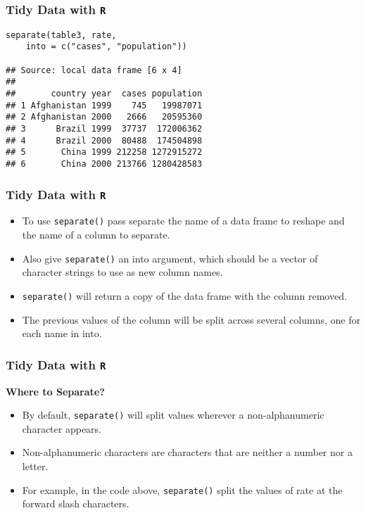 \documentclass[TIDYMASTER.tex]{subfiles}
\begin{document}
\begin{frame}[fragile]
	\frametitle{Tidy Data with \texttt{R}}
	\Large
\begin{verbatim}
separate(table3, rate, 
    into = c("cases", "population"))

## Source: local data frame [6 x 4]
## 
##       country year  cases population
## 1 Afghanistan 1999    745   19987071
## 2 Afghanistan 2000   2666   20595360
## 3      Brazil 1999  37737  172006362
## 4      Brazil 2000  80488  174504898
## 5       China 1999 212258 1272915272
## 6       China 2000 213766 1280428583
\end{verbatim}
\end{frame}
\begin{frame}[fragile]
\frametitle{Tidy Data with \texttt{R}}
\Large
\begin{itemize}
\item To use \texttt{separate()} pass separate the name of a data frame to reshape and the name of a column to separate. 
\item Also give \texttt{separate()} an into argument, which should be a vector of character strings to use as new column names. 
\item \texttt{separate()} will return a copy of the data frame with the column removed. 
\item The previous values of the column will be split across several columns, one for each name in into.
\end{itemize}

\end{frame}
\begin{frame}[fragile]
\frametitle{Tidy Data with \texttt{R}}
\Large
\vspace{-0.4cm}
\noindent \textbf{Where to Separate?}
\begin{itemize}
\item By default, \texttt{separate()} will split values wherever a non-alphanumeric character appears.
\item Non-alphanumeric characters are characters that are neither a number nor a letter. 
\item For example, in the code above, \texttt{separate()} split the values of rate at the forward slash characters.
\end{itemize}

\end{frame}
\end{document}
